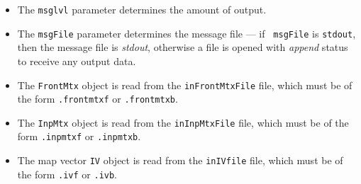 \begin{enumerate}
\begin{itemize}
\item
The {\tt msglvl} parameter determines the amount of output.
\item
The {\tt msgFile} parameter determines the message file --- if {\tt
msgFile} is {\tt stdout}, then the message file is {\it stdout},
otherwise a file is opened with {\it append} status to receive any
output data.
\item
The {\tt FrontMtx} object is read from the {\tt inFrontMtxFile} file,
which must be of the form {\tt *.frontmtxf} or {\tt *.frontmtxb}.
\item
The {\tt InpMtx} object is read from the {\tt inInpMtxFile} file,
which must be of the form {\tt *.inpmtxf} or {\tt *.inpmtxb}.
\item
The map vector {\tt IV} object is read from the {\tt inIVfile} file,
which must be of the form {\tt *.ivf} or {\tt *.ivb}.
\end{itemize}
\end{enumerate}
